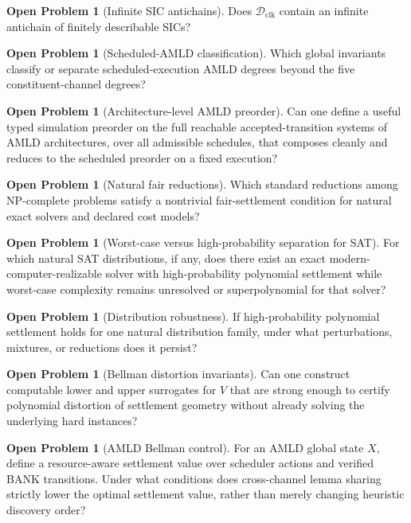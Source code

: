 \documentclass[11pt]{article}
\theoremstyle{definition}
\newtheorem{problem}[theorem]{Open Problem}
\newcommand{\Dclk}{\mathcal{D}_{\mathrm{clk}}}
\begin{document}
\begin{problem}[Infinite SIC antichains]
Does $\Dclk$ contain an infinite antichain of finitely describable SICs?
\end{problem}

\begin{problem}[Scheduled-AMLD classification]
Which global invariants classify or separate scheduled-execution AMLD degrees beyond the five constituent-channel degrees?
\end{problem}

\begin{problem}[Architecture-level AMLD preorder]
Can one define a useful typed simulation preorder on the full reachable accepted-transition systems of AMLD architectures, over all admissible schedules, that composes cleanly and reduces to the scheduled preorder on a fixed execution?
\end{problem}

\begin{problem}[Natural fair reductions]
Which standard reductions among NP-complete problems satisfy a nontrivial fair-settlement condition for natural exact solvers and declared cost models?
\end{problem}

\begin{problem}[Worst-case versus high-probability separation for SAT]
For which natural SAT distributions, if any, does there exist an exact modern-computer-realizable solver with high-probability polynomial settlement while worst-case complexity remains unresolved or superpolynomial for that solver?
\end{problem}

\begin{problem}[Distribution robustness]
If high-probability polynomial settlement holds for one natural distribution family, under what perturbations, mixtures, or reductions does it persist?
\end{problem}

\begin{problem}[Bellman distortion invariants]
Can one construct computable lower and upper surrogates for $V$ that are strong enough to certify polynomial distortion of settlement geometry without already solving the underlying hard instances?
\end{problem}

\begin{problem}[AMLD Bellman control]
For an AMLD global state $X$, define a resource-aware settlement value over scheduler actions and verified BANK transitions. Under what conditions does cross-channel lemma sharing strictly lower the optimal settlement value, rather than merely changing heuristic discovery order?
\end{problem}
\end{document}
